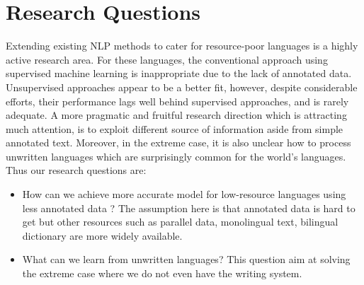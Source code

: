 \documentclass[12pt,twoside,final,hidelinks]{ltthesis}
\theoremstyle{definition}
\begin{document}
\section{Research Questions}
Extending existing NLP methods to cater for resource-poor languages is a highly active research area. For these languages, the conventional approach using supervised machine learning is inappropriate due to the lack of annotated data. Unsupervised approaches appear to be a better fit, however, despite considerable efforts, their performance lags well behind supervised approaches, and is rarely adequate. A more pragmatic and fruitful research direction which is attracting much attention, is to exploit different source of information aside from simple annotated text. Moreover, in the extreme case, it is also unclear how to process unwritten languages which are surprisingly common for the world's languages. Thus our research questions are: 
\begin{itemize}
\item How can we achieve more accurate model for low-resource languages using less annotated data ? The assumption here is that annotated data is hard to get but other resources such as parallel data, monolingual text, bilingual dictionary are more widely available. %


\item What can we learn from unwritten languages? This question aim at solving the extreme case where we do not even have the writing system. 
\end{itemize}
 
\end{document}
